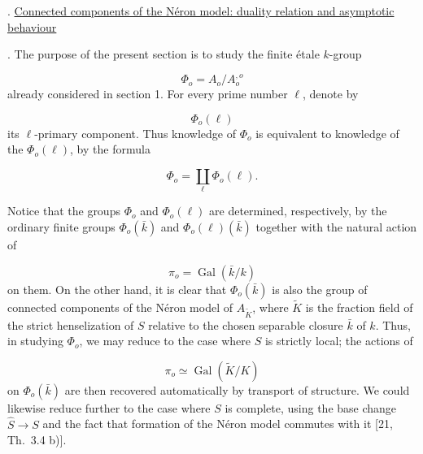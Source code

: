 
\medskip
{}. \underline{Connected components of the N\'eron model: duality
relation and asymptotic behaviour}

\smallskip
{}. The purpose of the present section is to study the finite \'etale
$k$-group

\begin{equation}\tag{11.0.1}
\Phi_o=A_o/A_o^{,o}
\end{equation}
already considered in section 1. For every prime number $\ell$, denote
by

\begin{equation*}
\Phi_o(\ell)
\end{equation*}
its $\ell$-primary component. Thus knowledge of $\Phi_o$ is equivalent
to knowledge of the $\Phi_o(\ell)$, by the formula

\begin{equation}\tag{11.0.2}
\Phi_o=\coprod_\ell\Phi_o(\ell).
\end{equation}

Notice that the groups $\Phi_o$ and $\Phi_o(\ell)$ are determined,
respectively, by the ordinary finite groups $\Phi_o(\bar k)$ and
$\Phi_o(\ell)(\bar k)$ together with the natural action of

\begin{equation*}
\pi_o=\operatorname{Gal}(\bar k/k)
\end{equation*}
on them. On the other hand, it is clear that $\Phi_o(\bar k)$ is also
the group of connected components of the N\'eron model of
$A_{\widetilde K}$, where $\widetilde K$ is the fraction field of the
strict henselization of $S$ relative to the chosen separable closure
$\bar k$ of $k$. Thus, in studying $\Phi_o$, we may reduce to the case
where $S$ is strictly local; the actions of

\begin{equation*}
\pi_o\simeq\operatorname{Gal}(\widetilde K/K)
\end{equation*}
on $\Phi_o(\bar k)$ are then recovered automatically by transport of
structure. We could likewise reduce further to the case where $S$ is
complete, using the base change $\widehat S\longrightarrow S$ and the
fact that formation of the N\'eron model commutes with it
[21, Th.~3.4 b)].

